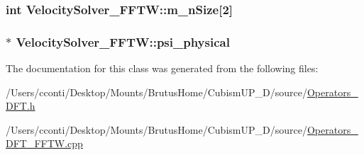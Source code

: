 \subsubsection[{m\+\_\+n\+Size}]{\setlength{\rightskip}{0pt plus 5cm}int Velocity\+Solver\+\_\+\+F\+F\+T\+W\+::m\+\_\+n\+Size\mbox{[}2\mbox{]}\hspace{0.3cm}{\ttfamily [protected]}}\label{class_velocity_solver___f_f_t_w_aacf92cd1fa310188280e3c7f6352bede}
\hypertarget{class_velocity_solver___f_f_t_w_ac0176cfda775251bb353dc0fdd3a21a4}{}
\subsubsection[{psi\+\_\+physical}]{$\ast$ Velocity\+Solver\+\_\+\+F\+F\+T\+W\+::psi\+\_\+physical\hspace{0.3cm}{\ttfamily [protected]}}\label{class_velocity_solver___f_f_t_w_ac0176cfda775251bb353dc0fdd3a21a4}


The documentation for this class was generated from the following files\+:\begin{DoxyCompactItemize}
\item 
/\+Users/cconti/\+Desktop/\+Mounts/\+Brutus\+Home/\+Cubism\+U\+P\+\_\+D/source/\hyperlink{_operators___d_f_t_8h}{Operators\+\_\+\+D\+F\+T.\+h}\item 
/\+Users/cconti/\+Desktop/\+Mounts/\+Brutus\+Home/\+Cubism\+U\+P\+\_\+D/source/\hyperlink{_operators___d_f_t___f_f_t_w_8cpp}{Operators\+\_\+\+D\+F\+T\+\_\+\+F\+F\+T\+W.\+cpp}\end{DoxyCompactItemize}
